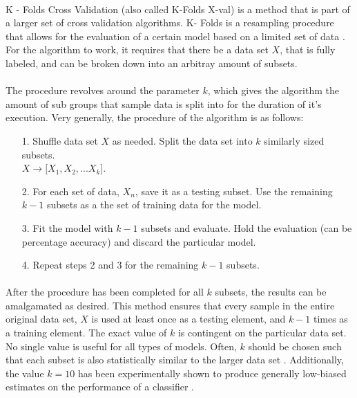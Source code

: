 \documentclass[12pt,letterpaper]{article}
\begin{document}
\paragraph*{} K - Folds Cross Validation (also called K-Folds X-val) is a method that is part of a larger set of cross validation algorithms. K- Folds is a resampling procedure that allows for the evaluation of a certain model based on a limited set of data \cite{Brownlee}. For the algorithm to work, it requires that there be a data set $X$, that is fully labeled, and can be broken down into an arbitray amount of subsets.
\paragraph*{}The procedure revolves around the parameter $k$, which gives the algorithm the amount of sub groups that sample data is split into for the duration of it's execution. Very generally, the procedure of the algorithm is as follows:
\begin{enumerate}
\item[1.]Shuffle data set $X$ as needed. Split the data set into $k$ similarly sized subsets. \\$X \rightarrow \big[ X_1 , X_2 , ... X_k \big]$.
\item[2.]For each set of data, $X_n$, save it as a testing subset. Use the remaining $k-1$ subsets as a the set of training data for the model.
\item[3.]Fit the model with $k-1$ subsets and evaluate. Hold the evaluation (can be percentage accuracy) and discard the particular model.
\item[4.]Repeat steps 2 and 3 for the remaining $k-1$ subsets.
\end{enumerate}
\paragraph*{}After the procedure has been completed for all $k$ subsets, the results can be amalgamated as desired. This method ensures that every sample in the entire original data set, $X$ is used at least once as a testing element, and $k-1$ times as a training element. The exact value of $k$ is contingent on the particular data set. No single value is useful for all types of models. Often, $k$ should be chosen such that each subset is also statistically similar to the larger data set \cite{Geron}. Additionally, the value $k = 10$ has been experimentally shown to produce generally low-biased estimates on the performance of a classifier \cite{Brownlee}.
\end{document}
